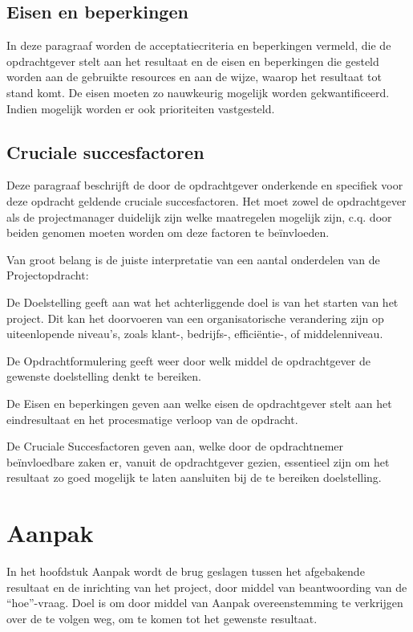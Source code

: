 \documentclass{article}
\begin{document}
\subsection{Eisen en beperkingen}
In deze paragraaf worden de acceptatiecriteria en beperkingen vermeld,
die de opdrachtgever stelt aan het resultaat en de eisen en beperkingen die gesteld worden aan de gebruikte resources en aan de wijze,
waarop het resultaat tot stand komt.
De eisen moeten zo nauwkeurig mogelijk worden gekwantificeerd.
Indien mogelijk worden er ook prioriteiten vastgesteld.

\subsection{Cruciale succesfactoren}
Deze paragraaf beschrijft de door de opdrachtgever onderkende en specifiek voor deze opdracht geldende cruciale succesfactoren.
Het moet zowel de opdrachtgever als de projectmanager duidelijk zijn welke maatregelen mogelijk zijn,
c.q. door beiden genomen moeten worden om deze factoren te be\"invloeden.


Van groot belang is de juiste interpretatie van een aantal onderdelen van de Projectopdracht:

De Doelstelling geeft aan wat het achterliggende doel is van het starten van het project.
Dit kan het doorvoeren van een organisatorische verandering zijn op uiteenlopende niveau's,
zoals klant-, bedrijfs-, effici\"entie-, of middelenniveau.

De Opdrachtformulering geeft weer door welk middel de opdrachtgever de gewenste doelstelling denkt te bereiken.

De Eisen en beperkingen geven aan welke eisen de opdrachtgever stelt aan het eindresultaat en het procesmatige verloop van de opdracht.

De Cruciale Succesfactoren geven aan,  welke door de opdrachtnemer be\"invloedbare zaken er, vanuit de opdrachtgever gezien, essentieel zijn om het resultaat zo goed mogelijk te laten aansluiten bij de te bereiken doelstelling.


\section{Aanpak}

In het hoofdstuk Aanpak wordt de brug geslagen tussen het afgebakende resultaat en de inrichting van het project,
door middel van beantwoording van de ``hoe''-vraag.
Doel is om door middel van Aanpak overeenstemming te verkrijgen over de te volgen weg, om te komen tot het gewenste resultaat.
\end{document}
